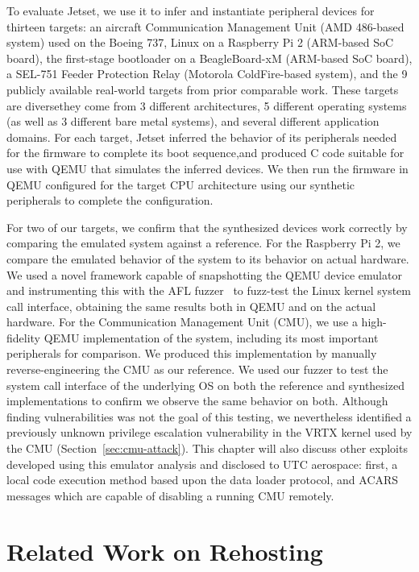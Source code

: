 To evaluate Jetset, we use it to infer and instantiate peripheral devices for thirteen targets: an aircraft Communication Management Unit (AMD 486-based system) used on the Boeing 737, Linux on a Raspberry Pi 2 (ARM-based SoC board), the first-stage bootloader on a BeagleBoard-xM (ARM-based SoC board), a SEL-751 Feeder Protection Relay (Motorola ColdFire-based system), and the 9 publicly available real-world targets from prior comparable work\cite{p2im2020}. 
These targets are diverse\textemdash they come from 3 different architectures, 5 different operating systems (as well as 3 different bare metal systems), and several different application domains.
For each target, Jetset inferred the behavior of its peripherals needed for the firmware to complete its boot sequence,and produced C code suitable for use with QEMU that simulates the inferred devices. 
We then run the firmware in QEMU configured for the target CPU architecture using our synthetic peripherals to complete the configuration.

For two of our targets, we confirm that the synthesized devices work
correctly by comparing the emulated system against a reference.  For
the Raspberry Pi 2, we compare the emulated behavior of the system to its
behavior on actual hardware.  
We used a novel framework capable of snapshotting the QEMU device emulator and instrumenting this with the AFL
fuzzer~\cite{zalewski2017technical} to fuzz-test the Linux
kernel system call interface, obtaining the same results both in QEMU
and on the actual hardware.  For the Communication Management Unit
(CMU), we use a high-fidelity QEMU implementation of the system,
including its most important peripherals for comparison.  We produced
this implementation by manually reverse-engineering the CMU as our
reference. We used our fuzzer to test the system call interface of the
underlying OS on both the reference and synthesized implementations to
confirm we observe the same behavior on both.  Although finding
vulnerabilities was not the goal of this testing, we nevertheless
identified a previously unknown privilege escalation vulnerability in
the VRTX kernel used by the CMU
(Section~\ref{sec:cmu-attack}).
This chapter will also discuss other exploits developed using this emulator analysis and disclosed to UTC aerospace: first, a local code execution method based upon the data loader protocol, and ACARS messages which are capable of disabling a running CMU remotely.

\section{Related Work on Rehosting}
\label{sec:rehost-related}


